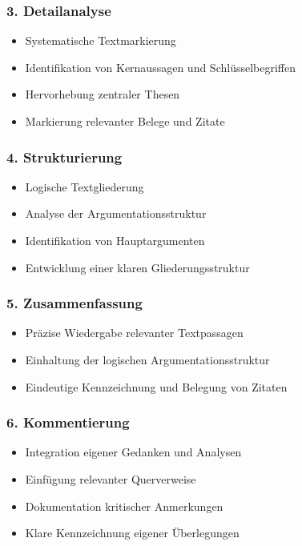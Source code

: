 \documentclass{vorlage-design-main}
\begin{document}
\subsubsection{3. Detailanalyse}\label{detailanalyse}

\begin{itemize}

\item
  Systematische Textmarkierung
\item
  Identifikation von Kernaussagen und Schlüsselbegriffen
\item
  Hervorhebung zentraler Thesen
\item
  Markierung relevanter Belege und Zitate
\end{itemize}

\subsubsection{4. Strukturierung}\label{strukturierung}

\begin{itemize}

\item
  Logische Textgliederung
\item
  Analyse der Argumentationsstruktur
\item
  Identifikation von Hauptargumenten
\item
  Entwicklung einer klaren Gliederungsstruktur
\end{itemize}

\subsubsection{5. Zusammenfassung}\label{zusammenfassung}

\begin{itemize}

\item
  Präzise Wiedergabe relevanter Textpassagen
\item
  Einhaltung der logischen Argumentationsstruktur
\item
  Eindeutige Kennzeichnung und Belegung von Zitaten
\end{itemize}

\subsubsection{6. Kommentierung}\label{kommentierung}

\begin{itemize}

\item
  Integration eigener Gedanken und Analysen
\item
  Einfügung relevanter Querverweise
\item
  Dokumentation kritischer Anmerkungen
\item
  Klare Kennzeichnung eigener Überlegungen
\end{itemize}
\end{document}
